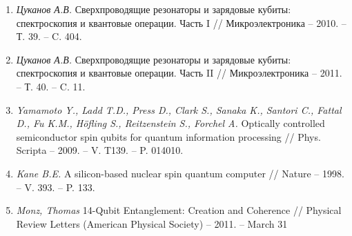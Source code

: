 \begin{enumerate}
\item \textit{Цуканов А.В.} Сверхпроводящие резонаторы и зарядовые
  кубиты: спектроскопия и квантовые операции. Часть I //
  Микроэлектроника -- 2010. -- Т. 39. -- C. 404.\label{lit:tsukanov-super-cond-one}
\item \textit{Цуканов А.В.} Сверхпроводящие резонаторы и зарядовые кубиты:
  спектроскопия и квантовые операции. Часть II //
  Микроэлектроника -- 2011. -- Т. 40. -- C. 11.\label{lit:tsukanov-super-cond-two}
\item \textit{Yamamoto Y., Ladd T.D., Press D.,  Clark S., Sanaka K., Santori
  C., Fattal D., Fu K.M., Höfling S., Reitzenstein S., Forchel
  A.} Optically controlled semiconductor spin qubits for quantum
  information processing //
  Phys. Scripta -- 2009. -- V. T139. -- P. 014010.\label{lit:dots}
\item \textit{Kane B.E.} A silicon-based nuclear spin quantum computer //
  Nature -- 1998. -- V. 393. -- P. 133.\label{lit:implant}
\item \textit{Monz, Thomas} 14-Qubit Entanglement: Creation
  and Coherence // Physical Review Letters (American Physical
  Society) -- 2011. -- March 31\label{lit:ion-trap}
\end{enumerate}

